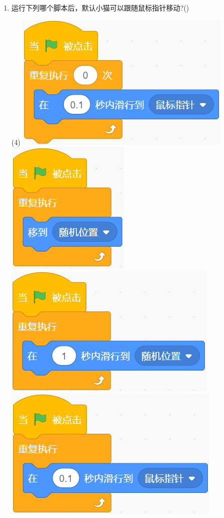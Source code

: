 \documentclass[10pt, a4paper]{article}
\begin{document}
\begin{enumerate}
        \item 运行下列哪个脚本后，默认小猫可以跟随鼠标指针移动?(\qquad)
        \begin{tasks}(4)
            \task \includegraphics[width=.18\textwidth]{25a.png}
            \task \includegraphics[width=.1\textwidth]{25b.png}
            \task \includegraphics[width=.18\textwidth]{25c.png}
            \task \includegraphics[width=.18\textwidth]{25d.png}
        \end{tasks}
    \end{enumerate}
\end{document}
